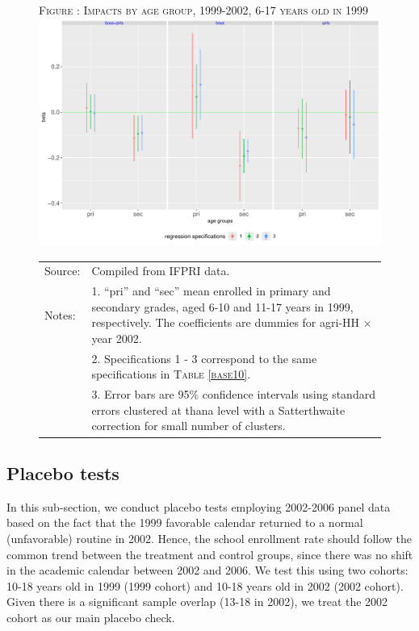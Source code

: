 \documentclass[12pt,letterpaper]{article}
\newcommand{\0}{\ensuremath{\mbox{\boldmath $0$}}}
\begin{document}
\begin{figure}
\hfil\textsc{\footnotesize Figure \thefigure: Impacts by age group, 1999-2002, 6-17 years old in 1999\label{GenderAgeGroup2Impacts}}\\
\hfil \includegraphics[height=.23\paperheight]{Figures/GenderAgeGroup2Impacts.pdf}\\
\renewcommand{\arraystretch}{1}
\hfil\begin{tabular}{>{\hfill\scriptsize}p{1cm}<{}>{\scriptsize}p{11cm}<{\hfill}}
Source: & Compiled from IFPRI data. \\[-1ex]
Notes:& 1. ``pri'' and ``sec'' mean enrolled in primary and secondary grades, aged 6-10 and 11-17 years in 1999, respectively. The coefficients are dummies for agri-HH $\times$ year 2002.\\[-1ex]
& 2. Specifications 1 - 3 correspond to the same specifications in \textsc{Table \ref{base10}}. \\[-1ex]
& 3. Error bars are 95\% confidence intervals using standard errors clustered at thana level with a Satterthwaite correction for small number of clusters.
\end{tabular}
\end{figure}

\subsection{Placebo tests}

In this sub-section, we conduct placebo tests employing 2002-2006 panel data based on the fact that the 1999 favorable calendar returned to a normal (unfavorable) routine in 2002. Hence, the school enrollment rate should follow the common trend between the treatment and control groups, since there was no shift in the academic calendar between 2002 and 2006. We test this using two cohorts: 10-18 years old in 1999 (1999 cohort) and 10-18 years old in 2002 (2002 cohort). Given there is a significant sample overlap (13-18 in 2002), we treat the 2002 cohort as our main placebo check. 
\end{document}
